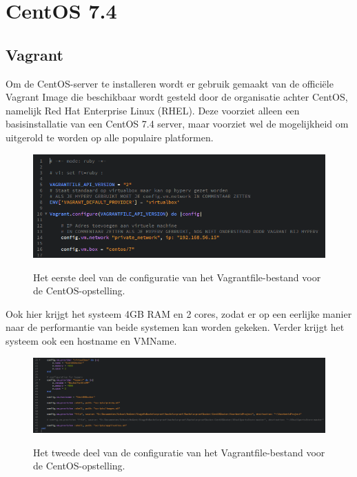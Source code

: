 \section{CentOS 7.4}

\subsection{Vagrant}
Om de CentOS-server te installeren wordt er gebruik gemaakt van de officiële Vagrant Image die beschikbaar wordt gesteld door de organisatie achter CentOS, namelijk Red Hat Enterprise Linux (RHEL). Deze voorziet alleen een basisinstallatie van een CentOS 7.4 server, maar voorziet wel de mogelijkheid om uitgerold te worden op alle populaire platformen.

\begin{figure}
	\centering
	\caption{Het eerste deel van de configuratie van het Vagrantfile-bestand voor de CentOS-opstelling.}
	\includegraphics[scale=0.75]{img/centosvagrant01}
	\label{centosvagrant01}
\end{figure}

Ook hier krijgt het systeem 4GB RAM en 2 cores, zodat er op een eerlijke manier naar de performantie van beide systemen kan worden gekeken. Verder krijgt het systeem ook een hostname en VMName.

\begin{figure}
	\centering
	\caption{Het tweede deel van de configuratie van het Vagrantfile-bestand voor de CentOS-opstelling.}
	\includegraphics[scale=0.6]{img/centosvagrant02}
	\label{centosvagrant02}
\end{figure}

